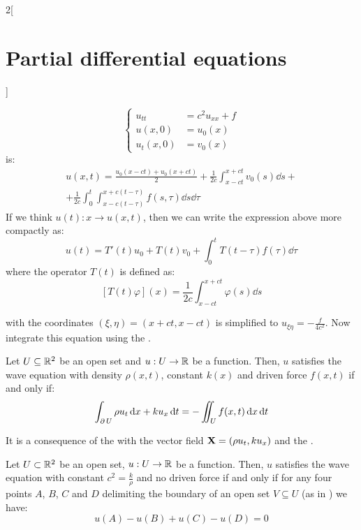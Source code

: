 \documentclass[../../../main_math.tex]{subfiles}
\begin{document}
\begin{multicols}{2}[\section{Partial differential equations}]
\begin{theorem}
\begin{equation}
      \left\{
      \begin{aligned}
        u_{tt}   & =c^2 u_{xx} +f \\
        u(x,0)   & =u_0(x)        \\
        u_t(x,0) & =v_0(x)
      \end{aligned}
      \right.
    \end{equation} is:
    \begin{multline*}
      u(x,t)=\frac{u_0(x-ct)+u_0(x+ct)}{2}+\frac{1}{2c}\int_{x-ct}^{x+ct}v_0(s)\dd{s}+\\+\frac{1}{2c}\int_0^t\int_{x-c(t-\tau)}^{x+c(t-\tau)}f(s,\tau)\dd{s}\dd{\tau}
    \end{multline*}
    If we think $u(t):x\rightarrow u(x,t)$, then we can write the expression above more compactly as: $$u(t)=T'(t)u_0+T(t)v_0+\int_0^tT(t-\tau) f(\tau)\dd{\tau}$$ where the operator $T(t)$ is defined as: $$\left[T(t)\varphi\right](x)=\frac{1}{2c}\int_{x-ct}^{x+ct}\varphi(s)\dd{s}$$
  \end{theorem}
  \begin{sproof}
     with the coordinates $(\xi, \eta) = (x+ ct,x-ct)$ is simplified to $u_{\xi\eta}=-\frac{f}{4c^2}$. Now integrate this equation using the .
  \end{sproof}
  \begin{theorem}\label{PDE:greenwave}
    Let $U\subseteq\mathbb{R}^2$ be an open set and $u:U\rightarrow\mathbb{R}$ be a function. Then, $u$ satisfies the wave equation with density $\rho(x,t)$, constant $k(x)$ and driven force $f(x,t)$ if and only if:
    $$\int_{\operatorname{\partial}{U}}\rho u_t\dd{x}+k u_x\dd{t}=-\iint_Uf(x,t)\dd{x}\dd{t}$$
  \end{theorem}
  \begin{sproof}
    It is a consequence of the  with the vector field $\boldsymbol{\mathrm{X}}= (\rho u_t,k u_x)$ and the .
  \end{sproof}
  \begin{proposition}
    Let $U\subset\mathbb{R}^2$ be an open set, $u:U\rightarrow\mathbb{R}$ be a function. Then, $u$ satisfies the wave equation with constant $c^2=\frac{k}{\rho}$ and no driven force if and only if for any four points $A$, $B$, $C$ and $D$ delimiting the boundary of an open set $V\subseteq U$ (as in ) we have:
    \begin{equation}\label{PDE:charwaveseq}
      u(A)-u(B)+u(C)-u(D)=0
    \end{equation}
  \end{proposition}

\end{multicols}
\end{document}
